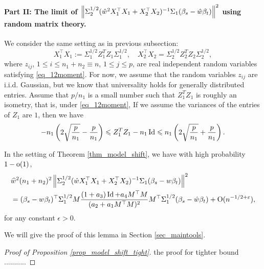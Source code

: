 \paragraph{Part II: The limit of $\left\| \Sigma_2^{1/2} (\hat{w}^2X_1^{\top}X_1 + X_2^{\top}X_2)^{-1}\Sigma_1 (\beta_s - \hat{w}\beta_t) \right\|^2$ using random matrix theory.}
We consider the same setting as in previous subsection:
$$ X_1^{\top}X_1:=\Sigma_1^{1/2}  Z_1^T Z_1 \Sigma_1^{1/2} ,\quad X_2^{\top}X_2= \Sigma_2^{1/2}  Z_2^T Z_2 \Sigma_2^{1/2},$$
where $z_{ij}$, $1 \leq i \leq n_1+n_2\equiv n$, $1 \leq j \leq p$, are real independent random variables satisfying \eqref{eq_12moment}. For now, we assume that the random variables $z_{ij}$ are i.i.d. Gaussian, but we know that universality holds for generally distributed entries. Assume that $p/n_1$ is a small number such that $Z_1^TZ_1$ is roughly an isometry, that is, under \eqref{eq_12moment},
{\color{blue}
If we assume the variances of the entries of $Z_1$ are $1$, then we have
\begin{align}
- {n_1} \left(2\sqrt{\frac{p}{n_1}} - {\frac{p}{n_1}}\right)  \leqslant {Z_1^T Z_1 -  n_1 \operatorname{Id}}  \leqslant {n_1} \left(2\sqrt{\frac{p}{n_1}} + {\frac{p}{n_1}}\right) . \label{eq_isometric}
\end{align}
}

\begin{lemma}\label{lem_cov_derivative}
	In the setting of Theorem \ref{thm_model_shift}, we have with high probability $1-{\rm o}(1)$,
\begin{equation}\label{lem_cov_derv_eq}
\begin{split}
&\widehat w^{2}(n_1+n_2)^2\left\| \Sigma_2^{1/2} (\hat{w}X_1^{\top}X_1 + X_2^{\top}X_2)^{-1}\Sigma_1 (\beta_s - {w}\beta_t) \right\|^2 \\
&= (\beta_s - {w}\beta_t)^{\top} \Sigma_1^{1/2} {M} \frac{(1 + a_3)\operatorname{Id} + a_4 {M}^{\top}{M}}{(a_2 + a_1 {M}^{\top}{M})^2} {M}^{\top} \Sigma_1^{1/2} (\beta_s - \hat{w}\beta_t) +\operatorname{O}(n^{-1/2+{\varepsilon}}),
\end{split}
\end{equation}
	for any constant $\epsilon>0$. %
\end{lemma}
We will give the proof of this lemma in Section \ref{sec_maintools}.

\begin{proof}[Proof of Proposition \ref{prop_model_shift_tight}]
the proof for tighter bound ........... 
\end{proof}

